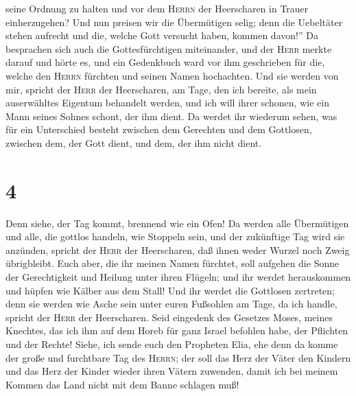 seine Ordnung zu halten und vor dem \textsc{Herrn} der Heerscharen in
Trauer einherzugehen?  Und nun preisen wir die
Übermütigen selig; denn die Uebeltäter stehen aufrecht und die, welche
Gott versucht haben, kommen davon!''  Da besprachen sich
auch die Gottesfürchtigen miteinander, und der \textsc{Herr} merkte
darauf und hörte es, und ein Gedenkbuch ward vor ihm geschrieben für
die, welche den \textsc{Herrn} fürchten und seinen Namen hochachten.
 Und sie werden von mir, spricht der \textsc{Herr} der
Heerscharen, am Tage, den ich bereite, als mein auserwähltes Eigentum
behandelt werden, und ich will ihrer schonen, wie ein Mann seines Sohnes
schont, der ihm dient.  Da werdet ihr wiederum sehen, was
für ein Unterschied besteht zwischen dem Gerechten und dem Gottlosen,
zwischen dem, der Gott dient, und dem, der ihm nicht dient.

\hypertarget{section-3}{%
\section{4}\label{section-3}}

 Denn siehe, der Tag kommt, brennend wie ein Ofen! Da
werden alle Übermütigen und alle, die gottlos handeln, wie Stoppeln
sein, und der zukünftige Tag wird sie anzünden, spricht der
\textsc{Herr} der Heerscharen, daß ihnen weder Wurzel noch Zweig
übrigbleibt.  Euch aber, die ihr meinen Namen fürchtet,
soll aufgehen die Sonne der Gerechtigkeit und Heilung unter ihren
Flügeln; und ihr werdet herauskommen und hüpfen wie Kälber aus dem
Stall!  Und ihr werdet die Gottlosen zertreten; denn sie
werden wie Asche sein unter euren Fußsohlen am Tage, da ich handle,
spricht der \textsc{Herr} der Heerscharen.  Seid eingedenk
des Gesetzes Moses, meines Knechtes, das ich ihm auf dem Horeb für ganz
Israel befohlen habe, der Pflichten und der Rechte! 
Siehe, ich sende euch den Propheten Elia, ehe denn da komme der große
und furchtbare Tag des \textsc{Herrn};  der soll das Herz
der Väter den Kindern und das Herz der Kinder wieder ihren Vätern
zuwenden, damit ich bei meinem Kommen das Land nicht mit dem Banne
schlagen muß!
